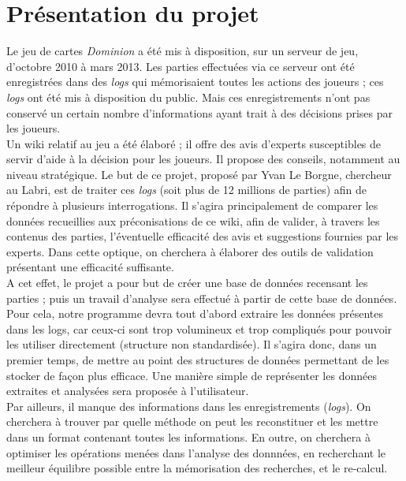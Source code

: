 \chapter{Présentation du projet}

Le jeu de cartes \textit{Dominion} a été mis à disposition, sur un serveur de jeu, d'octobre 2010 à mars 2013. Les parties effectuées via ce serveur ont été enregistrées dans des \textit{logs} qui mémorisaient toutes les actions des joueurs ; ces \textit{logs} ont été mis à disposition du public. Mais ces enregistrements n'ont pas conservé un certain nombre d'informations ayant trait à des décisions prises par les joueurs.\\

Un wiki\cite{WikiDom} relatif au jeu a été élaboré ; il offre des avis d'experts susceptibles de servir d'aide à la décision pour les joueurs. Il propose des conseils, notamment au niveau stratégique. Le but de ce projet, proposé par Yvan Le Borgne, chercheur au Labri, est de traiter ces \textit{logs} (soit plus de 12 millions de parties) afin de répondre à plusieurs interrogations. Il s'agira principalement de comparer les données recueillies aux préconisations de ce wiki, afin de valider, à travers les contenus des parties, l'éventuelle efficacité des avis et suggestions fournies par les experts. Dans cette optique, on cherchera à élaborer des outils de validation présentant une efficacité suffisante.\\
 
A cet effet, le projet a pour but de créer une base de données recensant les parties ; puis un travail d'analyse sera effectué à partir de cette base de données.
Pour cela, notre programme devra tout d'abord extraire les données présentes dans les logs, car ceux-ci sont trop volumineux et trop compliqués pour pouvoir les utiliser directement (structure non standardisée). Il s'agira donc, dans un premier temps, de mettre au point des structures de données permettant de les stocker de façon plus efficace. Une manière simple de représenter les données extraites et analysées sera proposée à l'utilisateur.\\

Par ailleurs, il manque des informations dans les enregistrements (\textit{logs}). On cherchera à trouver par quelle méthode on peut les reconstituer et les mettre dans un format contenant toutes les informations.
En outre, on cherchera à optimiser les opérations menées dans l'analyse des donnnées, en recherchant le meilleur équilibre possible entre la mémorisation des recherches, et le re-calcul.\\

